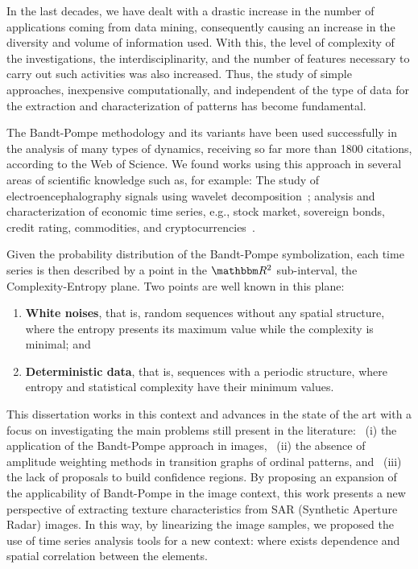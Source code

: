 \documentclass[a4,11pt]{pssbmac}
\begin{document}
In the last decades, we have dealt with a drastic increase in the number of applications coming from data mining, consequently causing an increase in the diversity and volume of information used.
With this, the level of complexity of the investigations, the interdisciplinarity, and the number of features necessary to carry out such activities was also increased.
Thus, the study of simple approaches, inexpensive computationally, and independent of the type of data for the extraction and characterization of patterns has become fundamental.

The Bandt-Pompe methodology and its variants have been used successfully in the analysis of many types of dynamics, receiving so far more than \num{1800} citations, according to the Web of Science.
We found works using this approach in several areas of scientific knowledge such as, for example:
The study of electroencephalography signals using wavelet decomposition~\cite{baravalle2018discriminating};
analysis and characterization of economic time series, e.g., stock market, sovereign bonds, credit rating, commodities, and cryptocurrencies~\cite{Araujo2019permutation}.

Given the probability distribution of the Bandt-Pompe symbolization, each time series is then described by a point in the $\mathbbm R^2$ sub-interval, the Complexity-Entropy plane.
Two points are well known in this plane:
\begin{enumerate}
    \item \textbf{White noises}, that is, random sequences without any spatial structure, where the entropy presents its maximum value while the complexity is minimal; and
    \item \textbf{Deterministic data}, that is, sequences with a periodic structure, where entropy and statistical complexity have their minimum values.
\end{enumerate}

This dissertation works in this context and advances in the state of the art with a focus on investigating the main problems still present in the literature: 
~(i) the application of the Bandt-Pompe approach in images, 
~(ii) the absence of amplitude weighting methods in transition graphs of ordinal patterns, and 
~(iii) the lack of proposals to build confidence regions.
By proposing an expansion of the applicability of Bandt-Pompe in the image context, this work presents a new perspective of extracting texture characteristics from SAR (Synthetic Aperture Radar) images.
In this way, by linearizing the image samples, we proposed the use of time series analysis tools for a new context: where exists dependence and spatial correlation between the elements.
\end{document}
